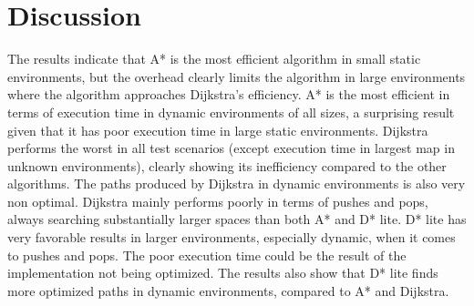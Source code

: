 \section{Discussion}

The results indicate that A* is the most efficient algorithm in small static environments, but the overhead clearly limits the algorithm in large environments where the algorithm approaches Dijkstra's efficiency. A* is the most efficient in terms of execution time in dynamic environments of all sizes, a surprising result given that it has poor execution time in large static environments.
Dijkstra performs the worst in all test scenarios (except execution time in largest map in unknown environments), clearly showing its inefficiency compared to the other algorithms. The paths produced by Dijkstra in dynamic environments is also very non optimal. Dijkstra mainly performs poorly in terms of pushes and pops, always searching substantially larger spaces than both A* and D* lite. 
D* lite has very favorable results in larger environments, especially dynamic, when it comes to pushes and pops. The poor execution time could be the result of the implementation not being optimized. The results also show that D* lite finds more optimized paths in dynamic environments, compared to A* and Dijkstra.

